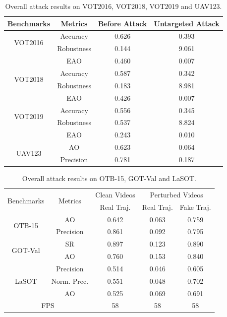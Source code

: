 \documentclass[journal]{IEEEtran}
\begin{document}
\begin{table}[h]
  \centering
  \caption{Overall attack results on VOT2016, VOT2018, VOT2019 and UAV123.}
  \begin{tabular}{c c | c | c}
  \toprule
  Benchmarks & Metrics & Before Attack    & Untargeted Attack  \\
  \midrule
  \multirow{2}{*}[-6pt]{VOT2016} 
  & Accuracy   & 0.626 & 0.393\\
  & Robustness & 0.144 & 9.061\\
  & EAO        & 0.460 & 0.007\\
  \midrule
  \multirow{2}{*}[-6pt]{VOT2018} 
  & Accuracy   & 0.587 & 0.342\\
  & Robustness & 0.183 & 8.981\\
  & EAO        & 0.426 & 0.007\\
  \midrule
  \multirow{2}{*}[-6pt]{VOT2019} 
  & Accuracy   & 0.556 & 0.345\\
  & Robustness & 0.537 & 8.824\\
  & EAO        & 0.243 & 0.010\\
  \midrule
  \multirow{3}{*}[+6pt]{UAV123} 
  & AO  & 0.623 & 0.064\\
  & Precision & 0.781 & 0.187\\
  \bottomrule
  \end{tabular}
  \label{tab:benchmark results1}
\end{table}

\begin{table}[t]
  \centering
  \caption{Overall attack results on OTB-15, GOT-Val and LaSOT.}
  \begin{tabular}{c c | c | c | c}
  \toprule
  \multirow{2}{*}[-2pt]{Benchmarks} & \multirow{2}{*}[-2pt]{Metrics} & Clean Videos    & \multicolumn{2}{c}{Perturbed Videos}  \\
  \cmidrule{3-5}
                            &                         & Real Traj. & Real Traj. & Fake Traj.     \\ 
  \midrule
  \multirow{2}{*}{OTB-15} 
  & AO   & 0.642 & 0.063 & 0.759\\
  & Precision & 0.861 & 0.092 & 0.795\\
  \midrule
  \multirow{2}{*}{GOT-Val} 
  & SR & 0.897 & 0.123 & 0.890\\
  & AO & 0.760 & 0.153 & 0.840 \\
  \midrule
  \multirow{3}{*}{LaSOT} 
  & Precision  & 0.514 & 0.046 & 0.605\\
  & Norm. Prec.& 0.551 & 0.048 & 0.702\\
  & AO         & 0.525 & 0.069 & 0.691\\
  \midrule
  \multicolumn{2}{c|}{FPS} & 58 & 58 & 58\\
  \bottomrule
  \end{tabular}
  \label{tab:benchmark results}
\end{table}
\end{document}

